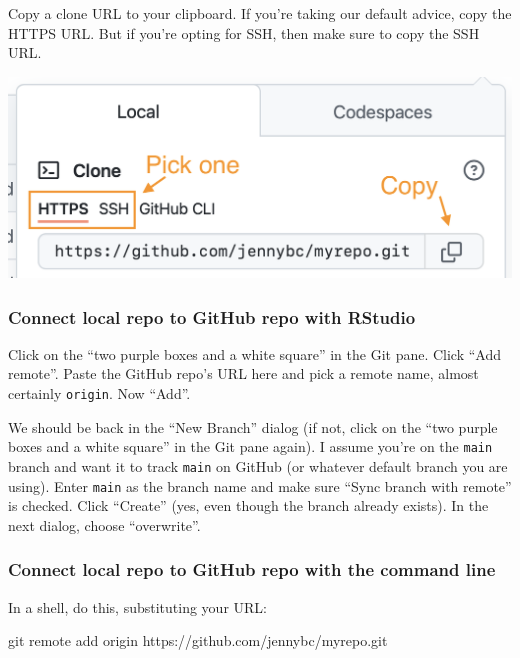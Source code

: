 \documentclass[
]{book}
\newenvironment{Shaded}{\begin{snugshade}}{\end{snugshade}}
\newcommand{\NormalTok}[1]{#1}
\begin{document}
Copy a clone URL to your clipboard.
If you're taking our default advice, copy the HTTPS URL.
But if you're opting for SSH, then make sure to copy the SSH URL.

\begin{center}\includegraphics[width=0.6\linewidth]{img/github-https-or-ssh-url-annotated} \end{center}

\subsubsection{Connect local repo to GitHub repo with RStudio}\label{connect-local-repo-to-github-repo-with-rstudio}

Click on the ``two purple boxes and a white square'' in the Git pane.
Click ``Add remote''.
Paste the GitHub repo's URL here and pick a remote name, almost certainly \texttt{origin}.
Now ``Add''.

We should be back in the ``New Branch'' dialog (if not, click on the ``two purple boxes and a white square'' in the Git pane again).
I assume you're on the \texttt{main} branch and want it to track \texttt{main} on GitHub (or whatever default branch you are using).
Enter \texttt{main} as the branch name and make sure ``Sync branch with remote'' is checked.
Click ``Create'' (yes, even though the branch already exists).
In the next dialog, choose ``overwrite''.

\subsubsection{Connect local repo to GitHub repo with the command line}\label{connect-local-repo-to-github-repo-with-the-command-line}

In a shell, do this, substituting your URL:

\begin{Shaded}
\begin{Highlighting}[]
\NormalTok{git remote add origin https://github.com/jennybc/myrepo.git}
\end{Highlighting}
\end{Shaded}
\end{document}
